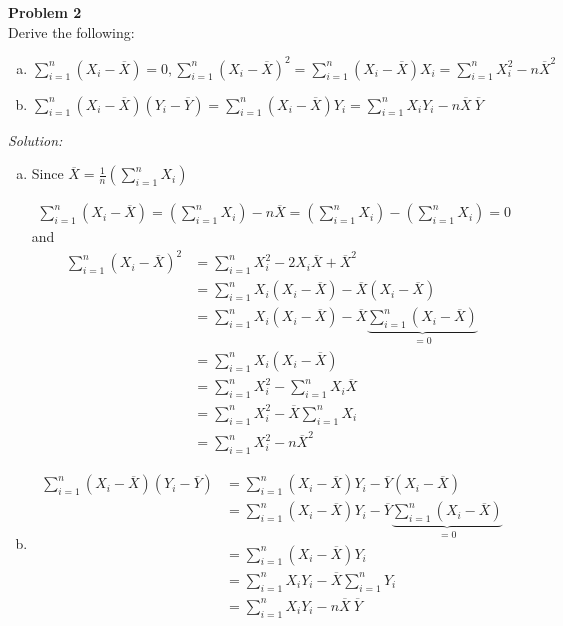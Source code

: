 \documentclass{article}
\newenvironment{problem}[2][Problem]
    { \begin{mdframed}[backgroundcolor=gray!20] \textbf{#1 #2} \\}
    {  \end{mdframed}}
\newenvironment{solution}
    {\textit{Solution:}}
    {}
\begin{document}
\begin{problem}{2}
Derive the following:
\begin{enumerate}[(a)]
\item $\sum_{i = 1}^n (X_i - \overline{X}) = 0, \sum_{i = 1}^n (X_i - \overline{X})^2 = \sum_{i = 1}^n (X_i - \overline{X})X_i = \sum_{i  =1}^n X_i^2 - n \overline{X}^2$
\item $\sum_{i = 1}^n (X_i - \overline{X}) (Y_i - \overline{Y}) = \sum_{i = 1}^n (X_i - \overline{X})Y_i = \sum_{i = 1}^n X_i Y_i - n \overline{X} \ \overline{Y}$
\end{enumerate}
\end{problem}
\begin{solution}
\begin{enumerate}[(a)]
\item  Since $\overline{X} =  \frac{1}{n}\left ( \sum_{i = 1}^n X_i \right)$

\begin{align*}
\sum_{i = 1}^n (X_i - \overline{X}) = \left ( \sum_{i = 1}^n X_i \right) - n \overline{X} =  \left ( \sum_{i = 1}^n X_i \right) -  \left ( \sum_{i = 1}^n X_i \right) = 0
\end{align*}
and 
\begin{align*}
\sum_{i = 1}^n (X_i - \overline{X})^2 &= \sum_{i = 1}^n X_i^2 - 2 X_i \overline{X} + \overline{X}^2 \\
&=  \sum_{i = 1}^n X_i (X_i - \overline{X})  - \overline{X}( X_i  - \overline{X})\\
&=  \sum_{i = 1}^n X_i (X_i - \overline{X})  - \overline{X} \underbrace{\sum_{i = 1}^n( X_i  - \overline{X})}_{= 0} \\
&= \sum_{i = 1}^n X_i (X_i - \overline{X}) \\
&= \sum_{i = 1}^n X_i^2 - \sum_{i = 1}^n X_i \overline{X} \\
&= \sum_{i = 1}^n X_i^2 - \overline{X} \sum_{i = 1}^n X_i   \\
&= \sum_{i = 1}^n X_i^2 -n  \overline{X}^2
\end{align*}
\item
\begin{align*}
\sum_{i = 1}^n (X_i - \overline{X}) (Y_i - \overline{Y})  &= \sum_{i = 1}^n (X_i - \overline{X}) Y_i - \overline{Y}(X_i - \overline{X})  \\
&= \sum_{i = 1}^n (X_i - \overline{X}) Y_i - \overline{Y} \underbrace{ \sum_{i = 1}^n (X_i - \overline{X}) }_{= 0}\\
&= \sum_{i = 1}^n (X_i - \overline{X}) Y_i\\
&= \sum_{i = 1}^n X_i Y_i - \overline{X}  \sum_{i = 1}^n  Y_i \\
&= \sum_{i = 1}^n X_i Y_i - n \overline{X} \ \overline{Y}
\end{align*}
\end{enumerate}
\end{solution}
\end{document}

